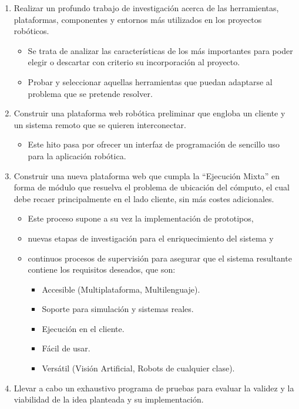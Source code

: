 \begin{enumerate}
\item Realizar un profundo trabajo de investigación acerca de las herramientas, plataformas, componentes y entornos más utilizados en los proyectos robóticos.
    \begin{itemize}
        \item Se trata de analizar las características de los más importantes para poder elegir o descartar con criterio su incorporación al proyecto.
        \item Probar y seleccionar aquellas herramientas que puedan adaptarse al problema que se pretende resolver.
    \end{itemize}
\item Construir una plataforma web robótica preliminar que engloba un cliente y un sistema remoto que se quieren interconectar.
    \begin{itemize}
        \item Este hito pasa por ofrecer un interfaz de programación de sencillo uso para la aplicación robótica.
    \end{itemize}
\item Construir una nueva plataforma web que cumpla la ``Ejecución Mixta'' en forma de módulo que resuelva el problema de ubicación del cómputo, el cual debe recaer principalmente en el lado cliente, sin más costes adicionales.
    \begin{itemize}
        \item Este proceso supone a su vez la implementación de prototipos,
        \item nuevas etapas de investigación para el enriquecimiento del sistema y
        \item continuos procesos de supervisión para asegurar que el sistema resultante contiene los requisitos deseados, que son:
        \begin{itemize}
            \item Accesible (Multiplataforma, Multilenguaje).
            \item Soporte para simulación y sistemas reales.
            \item Ejecución en el cliente.
            \item Fácil de usar.
            \item Versátil (Visión Artificial, Robots de cualquier clase).
        \end{itemize}
    \end{itemize}
\item  Llevar a cabo un exhaustivo programa de pruebas para evaluar la validez y la viabilidad de la idea planteada y su implementación.
\end{enumerate}

